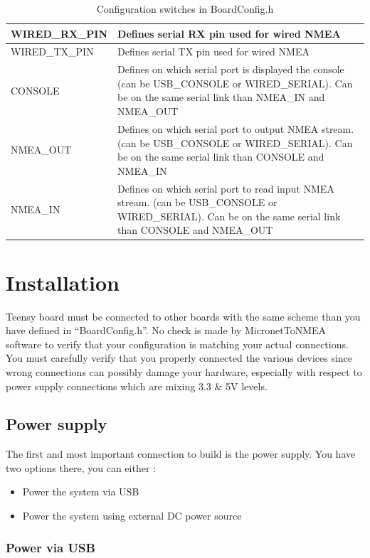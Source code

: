 \documentclass{report}
\begin{document}
\begin{table}[h]
\begin{tabular}{|l|p{12cm}|}
		WIRED\_RX\_PIN & Defines serial RX pin used for wired NMEA\\
		\hline
		WIRED\_TX\_PIN & Defines serial TX pin used for wired NMEA\\
		\hline
		CONSOLE & Defines on which serial port is displayed the console (can be USB\_CONSOLE or WIRED\_SERIAL). Can be on the same serial link than NMEA\_IN and NMEA\_OUT\\
		\hline
		NMEA\_OUT & Defines on which serial port to output NMEA stream. (can be USB\_CONSOLE or WIRED\_SERIAL). Can be on the same serial link than CONSOLE and NMEA\_IN\\
		\hline
		NMEA\_IN & Defines on which serial port to read input NMEA stream. (can be USB\_CONSOLE or WIRED\_SERIAL). Can be on the same serial link than CONSOLE and NMEA\_OUT\\
		\hline
\end{tabular}
	\caption{Configuration switches in BoardConfig.h}
\label{table:configswitches}
\end{table}

\chapter{Installation}

Teensy board must be connected to other boards with the same scheme than you have defined in “BoardConfig.h”. No check is made by MicronetToNMEA software to verify that your configuration is matching your actual connections. You must carefully verify that you properly connected the various devices since wrong connections can possibly damage your hardware, especially with respect to power supply connections which are mixing 3.3 \& 5V levels.

\section{Power supply}

The first and most important connection to build is the power supply. You have two options there, you can either :

\begin{itemize}
	\item Power the system via USB
	\item Power the system using external DC power source
\end{itemize}

\subsection{Power via USB}
\end{document}
